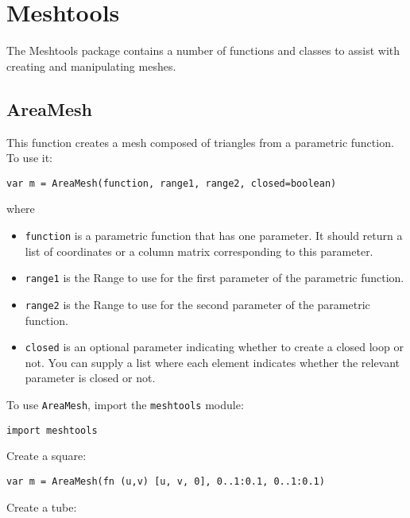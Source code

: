 \hypertarget{meshtools}{%
\section{Meshtools}\label{meshtools}}

The Meshtools package contains a number of functions and classes to
assist with creating and manipulating meshes.

\hypertarget{areamesh}{%
\subsection{AreaMesh}\label{areamesh}}

This function creates a mesh composed of triangles from a parametric
function. To use it:

\begin{lstlisting}
var m = AreaMesh(function, range1, range2, closed=boolean)
\end{lstlisting}

where

\begin{itemize}

\item
  \texttt{function} is a parametric function that has one parameter. It
  should return a list of coordinates or a column matrix corresponding
  to this parameter.
\item
  \texttt{range1} is the Range to use for the first parameter of the
  parametric function.
\item
  \texttt{range2} is the Range to use for the second parameter of the
  parametric function.
\item
  \texttt{closed} is an optional parameter indicating whether to create
  a closed loop or not. You can supply a list where each element
  indicates whether the relevant parameter is closed or not.
\end{itemize}

To use \texttt{AreaMesh}, import the \texttt{meshtools} module:

\begin{lstlisting}
import meshtools
\end{lstlisting}

Create a square:

\begin{lstlisting}
var m = AreaMesh(fn (u,v) [u, v, 0], 0..1:0.1, 0..1:0.1)
\end{lstlisting}

Create a tube:


